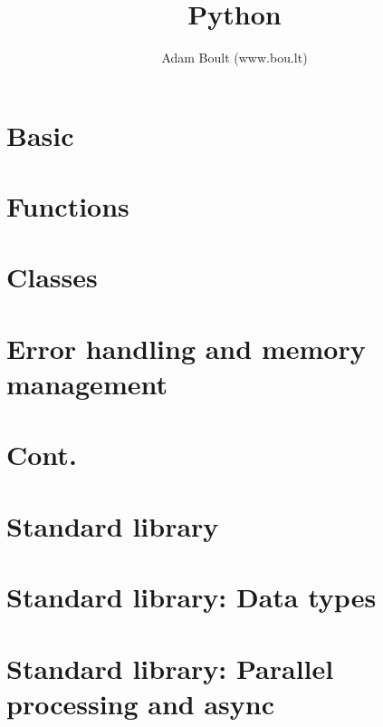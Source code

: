 \documentclass[oneside]{book}
\begin{document}
\author{Adam Boult (www.bou.lt)}
\title{Python}
\maketitle

\setcounter{tocdepth}{0}
\tableofcontents



\part{Basic}





\part{Functions}


\part{Classes}


\part{Error handling and memory management}




\part{Cont.}



\part{Standard library}













\part{Standard library: Data types}


\part{Standard library: Parallel processing and async}


\end{document}
